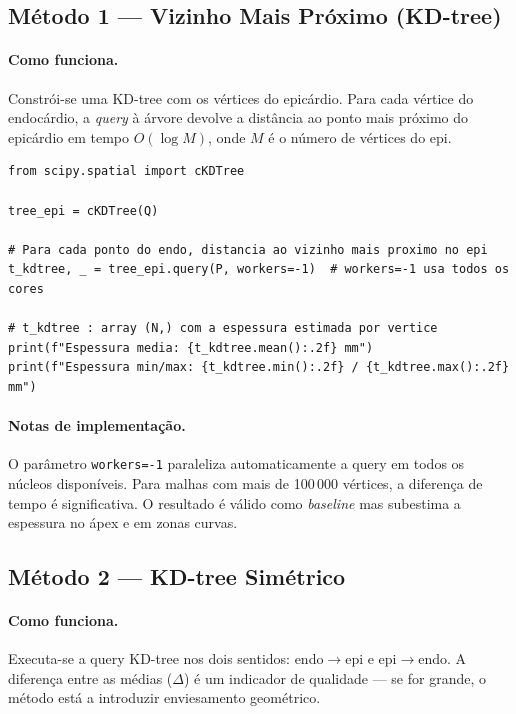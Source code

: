 \subsection{Método 1 --- Vizinho Mais Próximo (KD-tree)}
\label{impl:kdtree}

\paragraph{Como funciona.}
Constrói-se uma KD-tree com os vértices do epicárdio.
Para cada vértice do endocárdio, a \emph{query} à árvore devolve
a distância ao ponto mais próximo do epicárdio em tempo
$O(\log M)$, onde $M$ é o número de vértices do epi.

\begin{lstlisting}
from scipy.spatial import cKDTree

tree_epi = cKDTree(Q)

# Para cada ponto do endo, distancia ao vizinho mais proximo no epi
t_kdtree, _ = tree_epi.query(P, workers=-1)  # workers=-1 usa todos os cores

# t_kdtree : array (N,) com a espessura estimada por vertice
print(f"Espessura media: {t_kdtree.mean():.2f} mm")
print(f"Espessura min/max: {t_kdtree.min():.2f} / {t_kdtree.max():.2f} mm")
\end{lstlisting}

\paragraph{Notas de implementação.}
O parâmetro \texttt{workers=-1} paraleliza automaticamente a query em
todos os núcleos disponíveis. Para malhas com mais de 100\,000 vértices,
a diferença de tempo é significativa. O resultado é válido como
\emph{baseline} mas subestima a espessura no ápex e em zonas curvas.

\subsection{Método 2 --- KD-tree Simétrico}
\label{impl:symkd}

\paragraph{Como funciona.}
Executa-se a query KD-tree nos dois sentidos: endo$\to$epi
e epi$\to$endo. A diferença entre as médias ($\Delta$) é um
indicador de qualidade --- se for grande, o método está a
introduzir enviesamento geométrico.

